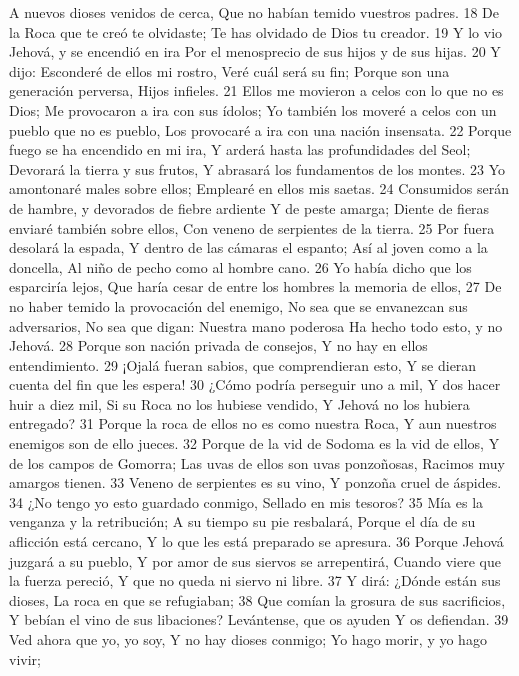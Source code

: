 A nuevos dioses venidos de cerca,
Que no habían temido vuestros padres. 
18 De la Roca que te creó te olvidaste;
Te has olvidado de Dios tu creador.
19 Y lo vio Jehová, y se encendió en ira
Por el menosprecio de sus hijos y de sus hijas. 
20 Y dijo: Esconderé de ellos mi rostro,
Veré cuál será su fin;
Porque son una generación perversa,
Hijos infieles.
21 Ellos me movieron a celos con lo que no es Dios;
Me provocaron a ira con sus ídolos;
Yo también los moveré a celos con un pueblo que no es pueblo,
Los provocaré a ira con una nación insensata. 
22 Porque fuego se ha encendido en mi ira,
Y arderá hasta las profundidades del Seol;
Devorará la tierra y sus frutos,
Y abrasará los fundamentos de los montes.
23 Yo amontonaré males sobre ellos;
Emplearé en ellos mis saetas.
24 Consumidos serán de hambre, y devorados de fiebre ardiente
Y de peste amarga;
Diente de fieras enviaré también sobre ellos,
Con veneno de serpientes de la tierra.
25 Por fuera desolará la espada,
Y dentro de las cámaras el espanto;
Así al joven como a la doncella,
Al niño de pecho como al hombre cano.
26 Yo había dicho que los esparciría lejos,
Que haría cesar de entre los hombres la memoria de ellos,
27 De no haber temido la provocación del enemigo,
No sea que se envanezcan sus adversarios,
No sea que digan: Nuestra mano poderosa
Ha hecho todo esto, y no Jehová.
28 Porque son nación privada de consejos,
Y no hay en ellos entendimiento.
29 ¡Ojalá fueran sabios, que comprendieran esto,
Y se dieran cuenta del fin que les espera!
30 ¿Cómo podría perseguir uno a mil,
Y dos hacer huir a diez mil,
Si su Roca no los hubiese vendido,
Y Jehová no los hubiera entregado? 
31 Porque la roca de ellos no es como nuestra Roca,
Y aun nuestros enemigos son de ello jueces.
32 Porque de la vid de Sodoma es la vid de ellos,
Y de los campos de Gomorra;
Las uvas de ellos son uvas ponzoñosas,
Racimos muy amargos tienen.
33 Veneno de serpientes es su vino,
Y ponzoña cruel de áspides.
34 ¿No tengo yo esto guardado conmigo,
Sellado en mis tesoros?
35 Mía es la venganza y la retribución;
A su tiempo su pie resbalará,
Porque el día de su aflicción está cercano,
Y lo que les está preparado se apresura.
36 Porque Jehová juzgará a su pueblo,
Y por amor de sus siervos se arrepentirá, 
Cuando viere que la fuerza pereció,
Y que no queda ni siervo ni libre.
37 Y dirá: ¿Dónde están sus dioses,
La roca en que se refugiaban;
38 Que comían la grosura de sus sacrificios,
Y bebían el vino de sus libaciones?
Levántense, que os ayuden
Y os defiendan.
39 Ved ahora que yo, yo soy,
Y no hay dioses conmigo;
Yo hago morir, y yo hago vivir;
